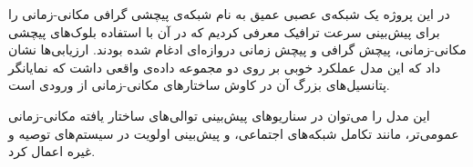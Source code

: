 در این پروژه یک شبکه‌ی عصبی عمیق به نام شبکه‌ی پیچشی گرافی مکانی-زمانی را برای پیش‌بینی سرعت ترافیک معرفی کردیم که در آن با استفاده بلوک‌های پیچشی مکانی-زمانی، پیچش گرافی و پیچش زمانی دروازه‌ای ادغام شده بودند. ارزیابی‌ها نشان داد که این مدل عملکرد خوبی بر روی دو مجموعه داده‌ی واقعی داشت که نمایانگر پتانسیل‌های بزرگ آن در کاوش ساختارهای مکانی-زمانی از ورودی است.

این مدل را می‌توان در سناریوهای پیش‌بینی توالی‌های ساختار یافته مکانی-زمانی عمومی‌تر، مانند تکامل شبکه‌های اجتماعی، و پیش‌بینی اولویت در سیستم‌های توصیه و غیره اعمال کرد.

